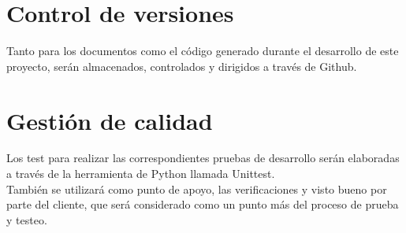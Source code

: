 \section{Control de versiones}

Tanto para los documentos como el código generado durante el desarrollo de este proyecto, serán almacenados, controlados y dirigidos a través de Github.

\section{Gestión de calidad}

Los test para realizar las correspondientes pruebas de desarrollo serán elaboradas a través de la herramienta de Python llamada Unittest.\\

También se utilizará como punto de apoyo, las verificaciones y visto bueno por parte del cliente, que será considerado como un punto más del proceso de prueba y testeo.

%
%

       
